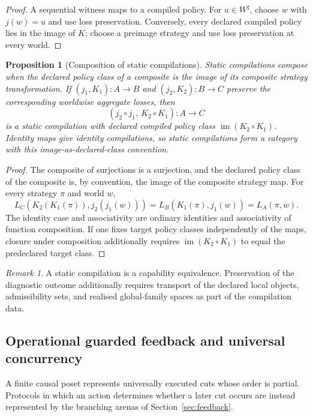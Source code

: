 \documentclass[11pt]{article}
\theoremstyle{plain}
\newtheorem{proposition}[theorem]{Proposition}
\theoremstyle{definition}
\theoremstyle{remark}
\newtheorem{remark}[theorem]{Remark}
\begin{document}
\begin{proof}
A sequential witness maps to a compiled policy. For $u\in W^\sharp$, choose
$w$ with $j(w)=u$ and use loss preservation. Conversely, every declared
compiled policy lies in the image of $K$; choose a preimage strategy and use
loss preservation at every world.
\end{proof}

\begin{proposition}[Composition of static compilations]
\label{prop:static-compilation-composition}
Static compilations compose when the declared policy class of a composite is the
image of its composite strategy transformation. If
\((j_1,K_1):A\to B\) and \((j_2,K_2):B\to C\) preserve the corresponding
worldwise aggregate losses, then
\[
(j_2\circ j_1,\ K_2\circ K_1):A\to C
\]
is a static compilation with declared compiled policy class
\(\operatorname{im}(K_2\circ K_1)\). Identity maps give identity compilations, so
static compilations form a category with this image-as-declared-class
convention.
\end{proposition}

\begin{proof}
The composite of surjections is a surjection, and the declared policy class of
the composite is, by convention, the image of the composite strategy map. For
every strategy \(\pi\) and world \(w\),
\[
L_C(K_2(K_1(\pi)),j_2(j_1(w)))
=L_B(K_1(\pi),j_1(w))
=L_A(\pi,w).
\]
The identity case and associativity are ordinary identities and associativity of
function composition. If one fixes target policy classes independently of the
maps, closure under composition additionally requires
\(\operatorname{im}(K_2\circ K_1)\) to equal the predeclared target class.
\end{proof}

\begin{remark}
A static compilation is a capability equivalence. Preservation of the diagnostic
outcome additionally requires transport of the declared local objects,
admissibility sets, and realised global-family spaces as part of the compilation
data.
\end{remark}

\subsection{Operational guarded feedback and universal concurrency}

A finite causal poset represents universally executed cuts whose order is
partial. Protocols in which an action determines whether a later cut occurs are
instead represented by the branching arenas of Section~\ref{sec:feedback}.
\end{document}
